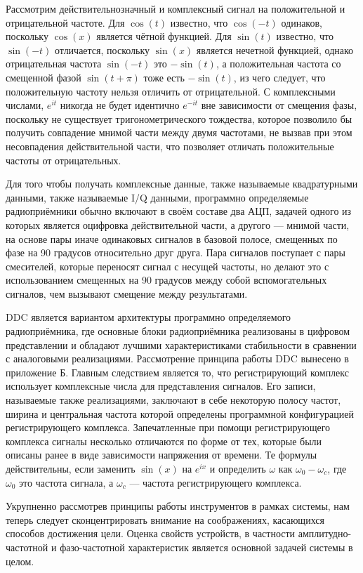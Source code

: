 \documentclass{report}
\begin{document}
Рассмотрим действительнозначный и комплексный сигнал на положительной и отрицательной частоте. Для $\cos(t)$ известно, что $\cos(-t)$ одинаков, поскольку $\cos(x)$ является чётной функцией. Для $\sin(t)$ известно, что $\sin(-t)$ отличается, поскольку $\sin(x)$ является нечетной функцией, однако отрицательная частота $\sin(-t)$ это $-\sin(t)$, а положительная частота со смещенной фазой $\sin(t + \pi)$ тоже есть $-\sin(t)$, из чего следует, что положительную частоту нельзя отличить от отрицательной. С комплексными числами, $e^{it}$ никогда не будет идентично $e^{-it}$ вне зависимости от смещения фазы, поскольку не существует тригонометрического тождества, которое позволило бы получить совпадение мнимой части между двумя частотами, не вызвав при этом несовпадения действительной части, что позволяет отличать положительные частоты от отрицательных.

Для того чтобы получать комплексные данные, также называемые квадратурными данными, также называемые I/Q данными, программно определяемые радиоприёмники обычно включают в своём составе два АЦП, задачей одного из которых является оцифровка действительной части, а другого --- мнимой части, на основе пары иначе одинаковых сигналов в базовой полосе, смещенных по фазе на 90 градусов относительно друг друга. Пара сигналов поступает с пары смесителей, которые переносят сигнал с несущей частоты, но делают это с использованием смещенных на 90 градусов между собой вспомогательных сигналов, чем вызывают смещение между результатами.

DDC является вариантом архитектуры программно определяемого радиоприёмника, где основные блоки радиоприёмника реализованы в цифровом представлении и обладают лучшими характеристиками стабильности в сравнении с аналоговыми реализациями. Рассмотрение принципа работы DDC вынесено в приложение Б. Главным следствием является то, что регистрирующий комплекс использует комплексные числа для представления сигналов. Его записи, называемые также реализациями, заключают в себе некоторую полосу частот, ширина и центральная частота которой определены программной конфигурацией регистрирующего комплекса. Запечатленные при помощи регистрирующего комплекса сигналы несколько отличаются по форме от тех, которые были описаны ранее в виде зависимости напряжения от времени. Те формулы действительны, если заменить $\sin(x)$ на $e^{ix}$ и определить $\omega$ как $\omega_0 - \omega_c$, где $\omega_0$ это частота сигнала, а $\omega_c$ --- частота регистрирующего комплекса.

Укрупненно рассмотрев принципы работы инструментов в рамках системы, нам теперь следует сконцентрировать внимание на соображениях, касающихся способов достижения цели. Оценка свойств устройств, в частности амплитудно-частотной и фазо-частотной характеристик является основной задачей системы в целом.
\end{document}

